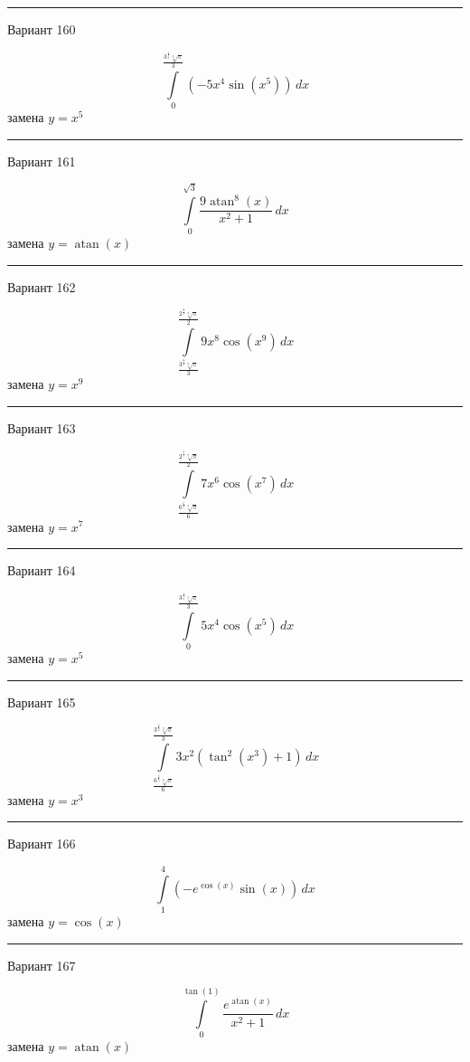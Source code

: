 \documentclass[11pt]{report}
\begin{document}
\rule{\textwidth}{.2mm}

Вариант 160

$$\int\limits_{0}^{\frac{3^{\frac{4}{5}} \sqrt[5]{\pi}}{3}} \left(- 5 x^{4} \sin{\left(x^{5} \right)}\right)\, dx$$
замена $y = x^{5}$



\rule{\textwidth}{.2mm}

Вариант 161

$$\int\limits_{0}^{\sqrt{3}} \frac{9 \operatorname{atan}^{8}{\left(x \right)}}{x^{2} + 1}\, dx$$
замена $y = \operatorname{atan}{\left(x \right)}$



\rule{\textwidth}{.2mm}

Вариант 162

$$\int\limits_{\frac{3^{\frac{8}{9}} \sqrt[9]{\pi}}{3}}^{\frac{2^{\frac{8}{9}} \sqrt[9]{\pi}}{2}} 9 x^{8} \cos{\left(x^{9} \right)}\, dx$$
замена $y = x^{9}$



\rule{\textwidth}{.2mm}

Вариант 163

$$\int\limits_{\frac{6^{\frac{6}{7}} \sqrt[7]{\pi}}{6}}^{\frac{2^{\frac{5}{7}} \sqrt[7]{\pi}}{2}} 7 x^{6} \cos{\left(x^{7} \right)}\, dx$$
замена $y = x^{7}$



\rule{\textwidth}{.2mm}

Вариант 164

$$\int\limits_{0}^{\frac{3^{\frac{4}{5}} \sqrt[5]{\pi}}{3}} 5 x^{4} \cos{\left(x^{5} \right)}\, dx$$
замена $y = x^{5}$



\rule{\textwidth}{.2mm}

Вариант 165

$$\int\limits_{\frac{6^{\frac{2}{3}} \sqrt[3]{\pi}}{6}}^{\frac{3^{\frac{2}{3}} \sqrt[3]{\pi}}{3}} 3 x^{2} \left(\tan^{2}{\left(x^{3} \right)} + 1\right)\, dx$$
замена $y = x^{3}$



\rule{\textwidth}{.2mm}

Вариант 166

$$\int\limits_{1}^{4} \left(- e^{\cos{\left(x \right)}} \sin{\left(x \right)}\right)\, dx$$
замена $y = \cos{\left(x \right)}$



\rule{\textwidth}{.2mm}

Вариант 167

$$\int\limits_{0}^{\tan{\left(1 \right)}} \frac{e^{\operatorname{atan}{\left(x \right)}}}{x^{2} + 1}\, dx$$
замена $y = \operatorname{atan}{\left(x \right)}$
\end{document}
